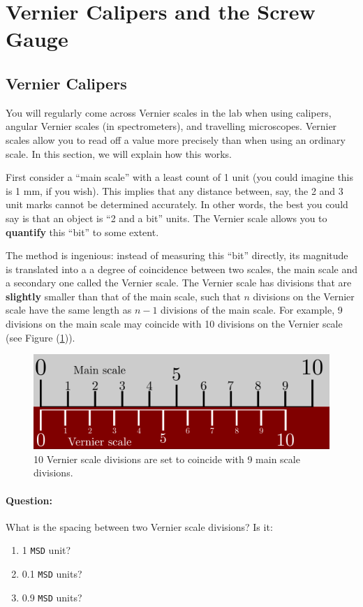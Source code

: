 \section{Vernier Calipers and the Screw Gauge}

\subsection{Vernier Calipers}

You will regularly come across Vernier scales in the lab when using calipers, angular Vernier scales (in spectrometers), and travelling microscopes. Vernier scales allow you to read off a value more precisely than when using an ordinary scale. In this section, we will explain how this works.

First consider a ``main scale'' with a least count of 1 unit (you could imagine this is 1 mm, if you wish). This implies that any distance between, say, the 2 and 3 unit marks cannot be determined accurately. In other words, the best you could say is that an object is ``2 and a bit'' units. The Vernier scale allows you to \textbf{quantify} this ``bit'' to some extent.  

The method is ingenious: instead of measuring this ``bit'' directly, its magnitude is translated into a a degree of coincidence between two scales, the main scale and a secondary one called the Vernier scale. The Vernier scale has divisions that are \textbf{slightly} smaller than that of the main scale, such that $n$ divisions on the Vernier scale have the same length as $n-1$ divisions of the main scale. For example,  9 divisions on the main scale may coincide with 10 divisions on the Vernier scale (see Figure (\ref{fig:Vernier_1})). 

\begin{figure}[!htb]
    \centering
    \includegraphics[scale=0.75]{figs/Vernier1.png}
    \caption{10 Vernier scale divisions are set to coincide with 9 main scale divisions.}
    \label{fig:Vernier_1}
\end{figure}

\begin{question}
    \paragraph{Question:} What is the spacing between two Vernier scale divisions? Is it:
    \begin{enumerate}
        \item 1 \texttt{MSD} unit?
        \item 0.1 \texttt{MSD} units?
        \item 0.9 \texttt{MSD} units?
    \end{enumerate}
\end{question}

